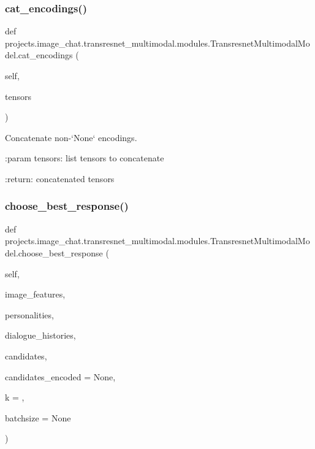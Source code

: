 \subsubsection{\texorpdfstring{cat\+\_\+encodings()}{cat\_encodings()}}
{\footnotesize\ttfamily def projects.\+image\+\_\+chat.\+transresnet\+\_\+multimodal.\+modules.\+Transresnet\+Multimodal\+Model.\+cat\+\_\+encodings (\begin{DoxyParamCaption}\item[{}]{self,  }\item[{}]{tensors }\end{DoxyParamCaption})}

\begin{DoxyVerb}Concatenate non-`None` encodings.

:param tensors:
    list tensors to concatenate

:return:
    concatenated tensors
\end{DoxyVerb}
 \mbox{\label{classprojects_1_1image__chat_1_1transresnet__multimodal_1_1modules_1_1TransresnetMultimodalModel_a528f9ad05ca6c0f0932b13b404ee054b}} 
\subsubsection{\texorpdfstring{choose\+\_\+best\+\_\+response()}{choose\_best\_response()}}
{\footnotesize\ttfamily def projects.\+image\+\_\+chat.\+transresnet\+\_\+multimodal.\+modules.\+Transresnet\+Multimodal\+Model.\+choose\+\_\+best\+\_\+response (\begin{DoxyParamCaption}\item[{}]{self,  }\item[{}]{image\+\_\+features,  }\item[{}]{personalities,  }\item[{}]{dialogue\+\_\+histories,  }\item[{}]{candidates,  }\item[{}]{candidates\+\_\+encoded = {\ttfamily None},  }\item[{}]{k = {},  }\item[{}]{batchsize = {\ttfamily None} }\end{DoxyParamCaption})}

